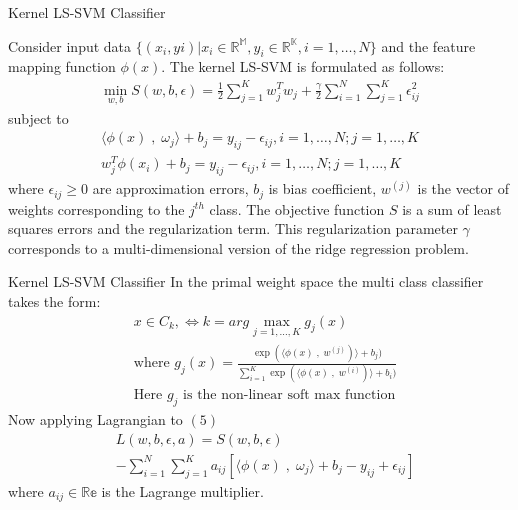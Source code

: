 \documentclass{beamer}
\begin{document}
    \begin{frame}{Kernel LS-SVM Classifier}

        Consider input data $\{(x_{i},y{i}) | x_{i}\in\mathbb{R^{M}},y_{i}\in\mathbb{R^{K}}, i = 1,\ldots,N\}$ and the
        feature mapping function $\phi(x)$.
        The kernel LS-SVM is formulated as follows:
        \begin{align}
            \min_{w,b} S(w,b,\epsilon) = \frac{1}{2}\sum_{j=1}^{K}w_{j}^{T}w_{j} + \frac{\gamma}{2}\sum_{i=1}^{N}\sum_{j=1}^{K}\epsilon_{ij}^{2}
        \end{align}
        subject to
        \begin{align}
            \langle \phi(x) \;,\; \omega_{j}  \rangle + b_{j} = y_{ij} - \epsilon_{ij}, i = 1,\ldots,N; j = 1,\ldots,K \\
            w_{j}^{T}\phi(x_{i}) + b_{j} = y_{ij} - \epsilon_{ij} , i = 1,\ldots,N; j = 1,\ldots,K
        \end{align}
        where $\epsilon_{ij} \geq 0$ are approximation errors, $b_{j}$ is bias coefficient, $w^{(j)}$ is the vector of
        weights corresponding to the $j^{th}$ class.
        The objective function $S$ is a sum of least squares errors and the
        regularization term.
        This regularization parameter $\gamma$ corresponds to a multi-dimensional version of the ridge
        regression problem.
    \end{frame}
    \begin{frame}{Kernel LS-SVM Classifier}
        In the primal weight space the multi class classifier takes the form:
        \begin{align*}
            & x \in C_{k}, \Leftrightarrow k= arg \max_{j=1,\ldots,K} g_{j}(x) \\
            & \text{where } g_{j}(x) = \frac{\exp(\langle \phi(x)\;,\; w^{(j)})\rangle + b_{j})}{\sum_{i=1}^{K} \exp(\langle \phi(x)\;,\; w^{(i)})\rangle + b_{i})} \\
            & \text{Here $g_{j}$ is the non-linear soft max function}
        \end{align*}
        Now applying Lagrangian to $(5)$
        \begin{align*}
            &L(w,b,\epsilon,a) = S(w,b,\epsilon)\\
            &- \sum_{i=1}^{N} \sum_{j=1}^{K} a_{ij}[\langle \phi(x) \;,\; \omega_{j}  \rangle + b_{j} - y_{ij} + \epsilon_{ij}]
        \end{align*}
        where $a_{ij} \in \mathbb{Re}$ is the Lagrange multiplier.
    \end{frame}
\end{document}
